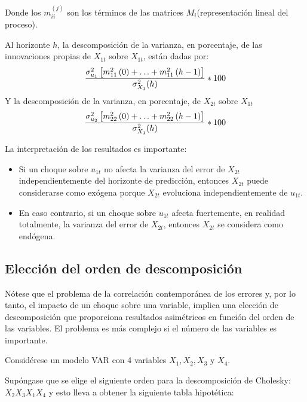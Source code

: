 \begin{enumerate}
Donde los $m_{ii}^{(j)}$ son los t\'{e}rminos de las matrices $M_{i} $(representaci\'{o}n lineal del proceso).

Al horizonte $h$, la descomposici\'{o}n de la varianza, en porcentaje, de las innovaciones propias de $X_{1t}$ sobre $X_{1t}$, est\'{a}n dadas por:
\[
\frac{\sigma_{u_{1}}^{2}\left[ m_{11}^{2}\left( 0 \right)+\mathellipsis +m_{11}^{2}\left( h-1 \right) \right]}{\sigma_{X_{1}}^{2}(h)}\ast 100
\]
Y la descomposici\'{o}n de la varianza, en porcentaje, de $X_{2t}$ sobre $X_{1t}$
\[
\frac{\sigma_{u_{2}}^{2}\left[ m_{22}^{2}\left( 0 \right)+\mathellipsis +m_{22}^{2}\left( h-1 \right) \right]}{\sigma_{X_{1}}^{2}(h)}\ast 100
\]

La interpretaci\'{o}n de los resultados es importante:
\begin{itemize}
      \item Si un choque sobre $u_{1t}$ no afecta la varianza del error de $X_{2t}$ independientemente del horizonte de predicci\'{o}n, entonces $X_{2t}$ puede considerarse como ex\'{o}gena porque $X_{2t}$ evoluciona independientemente de $u_{1t}$.
      \item En caso contrario, si un choque sobre $u_{1t}$ afecta fuertemente, en realidad totalmente, la varianza del error de $X_{2t}$, entonces $X_{2t}$ se considera como end\'{o}gena.
\end{itemize}

\subsection{Elecci\'{o}n del orden de descomposici\'{o}n}
N\'{o}tese que el problema de la correlaci\'{o}n contempor\'{a}nea de los errores y, por lo tanto, el impacto de un choque sobre una variable, implica una elecci\'{o}n de descomposici\'{o}n que proporciona resultados asim\'{e}tricos en funci\'{o}n del orden de las variables. El problema es m\'{a}s complejo si el n\'{u}mero de las variables es importante.

\begin{ejemplo}
Consid\'{e}rese un modelo VAR con 4 variables $X_{1}, X_{2}, X_{3}$ y $X_{4}$.
\end{ejemplo}

Sup\'{o}ngase que se elige el siguiente orden para la descomposici\'{o}n de Cholesky: $X_{2} X_{3} X_{1} X_{4}$ y esto lleva a obtener la siguiente tabla hipot\'{e}tica:


\end{enumerate}
